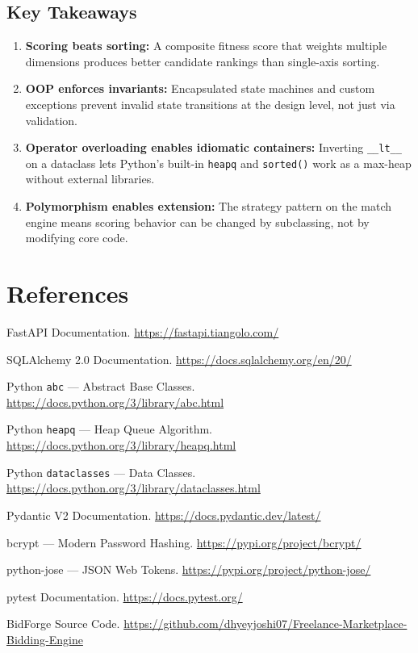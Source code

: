 \documentclass[12pt, a4paper]{report}
\begin{document}
\section{Key Takeaways}

\begin{enumerate}
  \item \textbf{Scoring beats sorting:} A composite fitness score that weights multiple dimensions produces better candidate rankings than single-axis sorting.
  \item \textbf{OOP enforces invariants:} Encapsulated state machines and custom exceptions prevent invalid state transitions at the design level, not just via validation.
  \item \textbf{Operator overloading enables idiomatic containers:} Inverting \texttt{\_\_lt\_\_} on a dataclass lets Python's built-in \texttt{heapq} and \texttt{sorted()} work as a max-heap without external libraries.
  \item \textbf{Polymorphism enables extension:} The strategy pattern on the match engine means scoring behavior can be changed by subclassing, not by modifying core code.
\end{enumerate}

\chapter*{References}

\begin{enumerate}[label={[\arabic*]}]
  \item FastAPI Documentation. \url{https://fastapi.tiangolo.com/}
  \item SQLAlchemy 2.0 Documentation. \url{https://docs.sqlalchemy.org/en/20/}
  \item Python \texttt{abc} --- Abstract Base Classes. \url{https://docs.python.org/3/library/abc.html}
  \item Python \texttt{heapq} --- Heap Queue Algorithm. \url{https://docs.python.org/3/library/heapq.html}
  \item Python \texttt{dataclasses} --- Data Classes. \url{https://docs.python.org/3/library/dataclasses.html}
  \item Pydantic V2 Documentation. \url{https://docs.pydantic.dev/latest/}
  \item bcrypt --- Modern Password Hashing. \url{https://pypi.org/project/bcrypt/}
  \item python-jose --- JSON Web Tokens. \url{https://pypi.org/project/python-jose/}
  \item pytest Documentation. \url{https://docs.pytest.org/}
  \item BidForge Source Code. \url{https://github.com/dhyeyjoshi07/Freelance-Marketplace-Bidding-Engine}
\end{enumerate}
\end{document}
